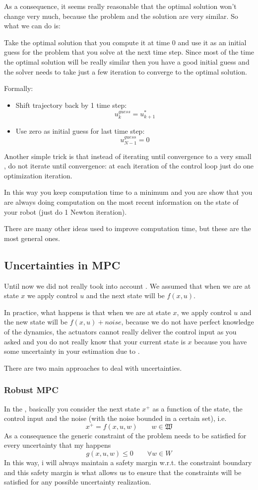 As a consequence, it seems really reasonable that the optimal solution won't change very much, because the problem and the solution are very similar. So what we can do is:

Take the optimal solution that you compute it at time $0$ and use it as an initial guess for the problem that you solve at the next time step. Since most of the time the optimal solution will be really similar then you have a good initial guess and the solver needs to take just a few iteration to converge to the optimal solution.

Formally:
\begin{itemize}
\item Shift trajectory back by 1 time step:
\[u^{guess}_k = u^*_{k+1}\]
\item Use zero as initial guess for last time step:
\[u_{N-1}^{guess} = 0\]
\end{itemize}

Another simple trick is that instead of iterating until convergence to a very small , do not iterate until convergence: at each iteration of the control loop just do one optimization iteration.

In this way you keep computation time to a minimum and you are show that you are always doing computation on the most recent information on the state of your robot (just do 1 Newton iteration).

There are many other ideas used to improve computation time, but these are the most general ones.

\subsection{Uncertainties in MPC}
Until now we did not really took into account . We assumed that when we are at state $x$ we apply control $u$ and the next state will be $f(x,u)$.

In practice, what happens is that when we are at state $x$, we apply control $u$ and the new state will be $f(x,u) + noise$, because we do not have perfect knowledge of the dynamics, the actuators cannot really deliver the control input as you asked and you do not really know that your current state is $x$ because you have some uncertainty in your estimation due to .

There are two main approaches to deal with uncertainties.
\subsubsection{Robust MPC}
In the , basically you consider the next state $x^+$ as a function of the state, the control input and the noise (with the noise bounded in a certain set), i.e.
\[x^+ = f(x,u,w)\qquad w\in \mathfrak{W}\]
As a consequence the generic constraint of the problem needs to be satisfied for every uncertainty that my happens
\[g(x,u,w)\le0\qquad \forall w\in W\]
In this way, i will always maintain a safety margin w.r.t. the constraint boundary and this safety margin is what allows us to ensure that the constraints will be satisfied for any possible uncertainty realization.

